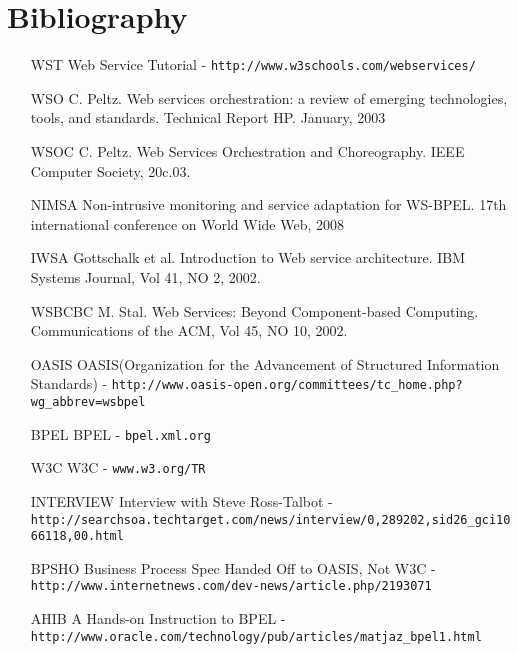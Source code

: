 \documentclass[11pt,a4paper]{article}
\begin{document}
\section{Bibliography}
\begin{itemize}
\item[WST] Web Service Tutorial - \verb!http://www.w3schools.com/webservices/!

\item[WSO] C. Peltz. Web services orchestration: a review of emerging technologies, tools, and standards. Technical Report HP. January, 2003

\item[WSOC] C. Peltz. Web Services Orchestration and Choreography. IEEE Computer Society, 20c.03.

\item[NIMSA] Non-intrusive monitoring and service adaptation for WS-BPEL. 17th international conference on World Wide Web, 2008

\item[IWSA] Gottschalk et al. Introduction to Web service architecture. IBM Systems Journal, Vol 41, NO 2, 2002.

\item[WSBCBC] M. Stal. Web Services: Beyond Component-based Computing. Communications of the ACM, Vol 45, NO 10, 2002.

\item[OASIS] OASIS(Organization for the Advancement of Structured Information Standards) - \verb!http://www.oasis-open.org/committees/tc_home.php?wg_abbrev=wsbpel!

\item[BPEL] BPEL - \verb!bpel.xml.org!

\item[W3C] W3C - \verb!www.w3.org/TR!

\item[INTERVIEW] Interview with Steve Ross-Talbot - \verb!http://searchsoa.techtarget.com/news/interview/0,289202,sid26_gci1066118,00.html!

\item[BPSHO] Business Process Spec Handed Off to OASIS, Not W3C - \verb!http://www.internetnews.com/dev-news/article.php/2193071!

\item[AHIB] A Hands-on Instruction to BPEL - \verb!http://www.oracle.com/technology/pub/articles/matjaz_bpel1.html!

\end{itemize}
\end{document}
